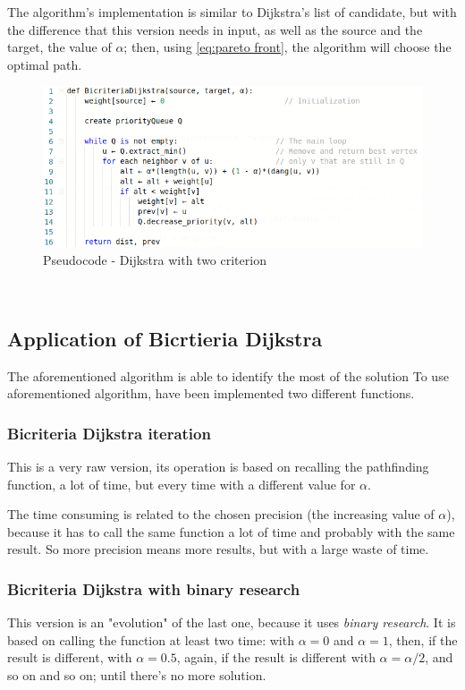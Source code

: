 \documentclass[a4paper,11pt]{report}
\begin{document}
\vspace{5mm}

The algorithm's implementation is similar to Dijkstra's list of candidate, but with the difference that this version needs in input, as well as the source and the target, the value of $\alpha$; then, using \eqref{eq:pareto front}, the algorithm will choose the optimal path.

\begin{figure}[h]
	\centering
	\includegraphics[width=\linewidth]{img/bicriteriaDijkstra.png}
	\caption{Pseudocode - Dijkstra with two criterion}
	\label{fig:bicriteriaDijkstra}
\end{figure}
\
\subsection{Application of Bicrtieria Dijkstra}
The aforementioned algorithm is able to identify the most of the solution 
To use aforementioned algorithm, have been implemented two different functions.

\subsubsection{Bicriteria Dijkstra iteration}
This is a very raw version, its operation is based on recalling the pathfinding function, a lot of time, but every time with a different value for $\alpha$.

The time consuming is related to the chosen precision (the increasing value of $\alpha$), because it has to call the same function a lot of time and probably with the same result. So more precision means more results, but with a large waste of time.

\subsubsection{Bicriteria Dijkstra with binary research}
This version is an "evolution" of the last one, because it uses \textit{binary research}. It is based on calling the function at least two time: with $\alpha = 0$ and $\alpha=1$, then, if the result is different, with $\alpha=0.5$, again, if the result is different with $\alpha=\alpha/2$, and so on and so on; until there's no more solution.
\end{document}
